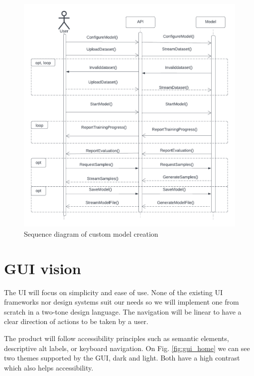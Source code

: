 \documentclass{article}
\begin{document}
\begin{figure}[H]
    \centering
    \includegraphics[width=\textwidth]{sequencediagram.png}
    \caption{Sequence diagram of custom model creation}
\end{figure}

\section{GUI vision} %

The UI will focus on simplicity and ease of use. None of the existing UI frameworks nor design systems suit our needs so we will implement one from scratch in a two-tone design language. The navigation will be linear to have a clear direction of actions to be taken by a user.

The product will follow accessibility principles such as semantic elements, descriptive alt labels, or keyboard navigation. On Fig. \ref{fig:gui_home} we can see two themes supported by the GUI, dark and light. Both have a high contrast which also helps accessibility.
\end{document}
